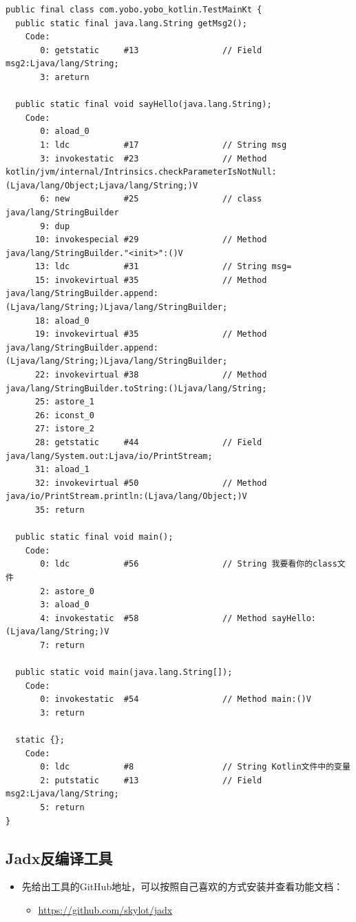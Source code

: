 \documentclass[9pt, b5paper]{article}
\begin{document}
\begin{verbatim}
public final class com.yobo.yobo_kotlin.TestMainKt {
  public static final java.lang.String getMsg2();
    Code:
       0: getstatic     #13                 // Field msg2:Ljava/lang/String;
       3: areturn

  public static final void sayHello(java.lang.String);
    Code:
       0: aload_0
       1: ldc           #17                 // String msg
       3: invokestatic  #23                 // Method kotlin/jvm/internal/Intrinsics.checkParameterIsNotNull:(Ljava/lang/Object;Ljava/lang/String;)V
       6: new           #25                 // class java/lang/StringBuilder
       9: dup
      10: invokespecial #29                 // Method java/lang/StringBuilder."<init>":()V
      13: ldc           #31                 // String msg=
      15: invokevirtual #35                 // Method java/lang/StringBuilder.append:(Ljava/lang/String;)Ljava/lang/StringBuilder;
      18: aload_0
      19: invokevirtual #35                 // Method java/lang/StringBuilder.append:(Ljava/lang/String;)Ljava/lang/StringBuilder;
      22: invokevirtual #38                 // Method java/lang/StringBuilder.toString:()Ljava/lang/String;
      25: astore_1
      26: iconst_0
      27: istore_2
      28: getstatic     #44                 // Field java/lang/System.out:Ljava/io/PrintStream;
      31: aload_1
      32: invokevirtual #50                 // Method java/io/PrintStream.println:(Ljava/lang/Object;)V
      35: return
 
  public static final void main();
    Code:
       0: ldc           #56                 // String 我要看你的class文件
       2: astore_0
       3: aload_0
       4: invokestatic  #58                 // Method sayHello:(Ljava/lang/String;)V
       7: return
 
  public static void main(java.lang.String[]);
    Code:
       0: invokestatic  #54                 // Method main:()V
       3: return
 
  static {};
    Code:
       0: ldc           #8                  // String Kotlin文件中的变量
       2: putstatic     #13                 // Field msg2:Ljava/lang/String;
       5: return
}
\end{verbatim}
\subsection{Jadx反编译工具}
\label{sec-5-3}
\begin{itemize}
\item 先给出工具的GitHub地址，可以按照自己喜欢的方式安装并查看功能文档：
\begin{itemize}
\item \url{https://github.com/skylot/jadx}
\end{itemize}
\end{itemize}
\end{document}
